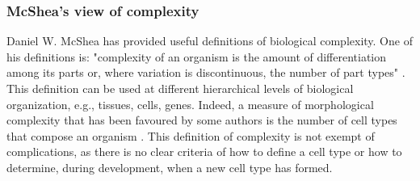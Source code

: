 %
%


\subsubsection{McShea's view of complexity}

Daniel W. McShea has provided useful definitions of biological complexity. One of his definitions is: "complexity of an organism is the amount of differentiation among its parts or, where variation is discontinuous, the number of part types" \citep{McShea1996,McShea2015}.
This definition can be used at different hierarchical levels of biological organization, e.g., tissues, cells, genes.
Indeed, a measure of morphological complexity that has been favoured by some authors 
is the number of cell types that compose an organism \citep{Valentine1994,Bell1997,Bonner2004}.
This definition of complexity is not exempt of complications, as there is no clear criteria of how to define a cell type or how to determine, during development, when a new cell type has formed.

